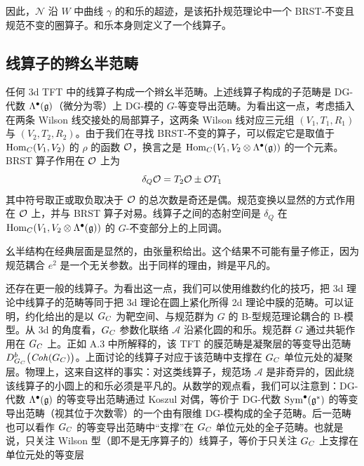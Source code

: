 
因此，$\mathcal{N}$ 沿 $W$ 中曲线 $\gamma$ 的和乐的超迹，是该拓扑规范理论中一个 BRST-不变且规范不变的圈算子。和乐本身则定义了一个线算子。

\subsection*{线算子的辫幺半范畴}

任何 3d TFT 中的线算子构成一个辫幺半范畴。上述线算子构成的子范畴是 DG-代数 $\Lambda^\bullet(\mathfrak{g})$（微分为零）上 DG-模的 $G$-等变导出范畴。为看出这一点，考虑插入在两条 Wilson 线交接处的局部算子，这两条 Wilson 线对应三元组 $(V_1,T_1,R_1)$ 与 $(V_2,T_2,R_2)$。由于我们在寻找 BRST-不变的算子，可以假定它是取值于 $\operatorname{Hom}_C(V_1,V_2)$ 的 $\rho$ 的函数 $\mathcal{O}$，换言之是 $\operatorname{Hom}_C(V_1,V_2\otimes\Lambda^\bullet(\mathfrak{g}))$ 的一个元素。BRST 算子作用在 $\mathcal{O}$ 上为
\[
  \delta_Q\mathcal{O}=T_2\mathcal{O}\pm\mathcal{O} T_1
\]
其中符号取正或取负取决于 $\mathcal{O}$ 的总次数是奇还是偶。规范变换以显然的方式作用在 $\mathcal{O}$ 上，并与 BRST 算子对易。线算子之间的态射空间是 $\delta_Q$ 在 $\operatorname{Hom}_C(V_1,V_2\otimes\Lambda^\bullet(\mathfrak{g}))$ 的 $G$-不变部分上的上同调。

幺半结构在经典层面是显然的，由张量积给出。这个结果不可能有量子修正，因为规范耦合 $e^2$ 是一个无关参数。出于同样的理由，辫是平凡的。

还存在更一般的线算子。为看出这一点，我们可以使用维数约化的技巧，把 3d 理论中线算子的范畴等同于把 3d 理论在圆上紧化所得 2d 理论中膜的范畴。可以证明，约化给出的是以 $G_C$ 为靶空间、与规范群为 $G$ 的 B-型规范理论耦合的 B-模型。从 3d 的角度看，$G_C$ 参数化联络 $\mathcal{A}$ 沿紧化圆的和乐。规范群 $G$ 通过共轭作用在 $G_C$ 上。正如 A.3 中所解释的，该 TFT 的膜范畴是凝聚层的等变导出范畴 $D^b_{G_C}\big(\mathit{Coh}(G_C)\big)$。上面讨论的线算子对应于该范畴中支撑在 $G_C$ 单位元处的凝聚层。物理上，这来自这样的事实：对这类线算子，规范场 $\mathcal{A}$ 是非奇异的，因此绕该线算子的小圆上的和乐必须是平凡的。从数学的观点看，我们可以注意到：DG-代数 $\Lambda^\bullet(\mathfrak{g})$ 的等变导出范畴通过 Koszul 对偶，等价于 DG-代数 $\mathrm{Sym}^\bullet(\mathfrak{g}^*)$ 的等变导出范畴（视其位于次数零）的一个由有限维 DG-模构成的全子范畴。后一范畴也可以看作 $G_C$ 的等变导出范畴中“支撑”在 $G_C$ 单位元处的全子范畴。也就是说，只关注 Wilson 型（即不是无序算子的）线算子，等价于只关注 $G_C$ 上支撑在单位元处的等变层

